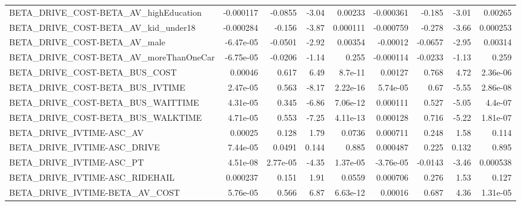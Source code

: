 \begin{tabular}{lrrrrrrrr}
BETA\_DRIVE\_COST-BETA\_AV\_highEducation              &   -0.000117 &      -0.0855 &    -3.04 &  0.00233 &  -0.000361 &      -0.185 &        -3.01 &       0.00265 \\
BETA\_DRIVE\_COST-BETA\_AV\_kid\_under18                &   -0.000284 &       -0.156 &    -3.87 & 0.000111 &  -0.000759 &      -0.278 &        -3.66 &      0.000253 \\
BETA\_DRIVE\_COST-BETA\_AV\_male                       &   -6.47e-05 &      -0.0501 &    -2.92 &  0.00354 &   -0.00012 &     -0.0657 &        -2.95 &       0.00314 \\
BETA\_DRIVE\_COST-BETA\_AV\_moreThanOneCar             &   -6.75e-05 &      -0.0206 &    -1.14 &    0.255 &  -0.000114 &     -0.0233 &        -1.13 &         0.259 \\
BETA\_DRIVE\_COST-BETA\_BUS\_COST                      &     0.00046 &        0.617 &     6.49 &  8.7e-11 &    0.00127 &       0.768 &         4.72 &      2.36e-06 \\
BETA\_DRIVE\_COST-BETA\_BUS\_IVTIME                    &    2.47e-05 &        0.563 &    -8.17 & 2.22e-16 &   5.74e-05 &        0.67 &        -5.55 &      2.86e-08 \\
BETA\_DRIVE\_COST-BETA\_BUS\_WAITTIME                  &    4.31e-05 &        0.345 &    -6.86 & 7.06e-12 &   0.000111 &       0.527 &        -5.05 &       4.4e-07 \\
BETA\_DRIVE\_COST-BETA\_BUS\_WALKTIME                  &    4.71e-05 &        0.553 &    -7.25 & 4.11e-13 &   0.000128 &       0.716 &        -5.22 &      1.81e-07 \\
BETA\_DRIVE\_IVTIME-ASC\_AV                           &     0.00025 &        0.128 &     1.79 &   0.0736 &   0.000711 &       0.248 &         1.58 &         0.114 \\
BETA\_DRIVE\_IVTIME-ASC\_DRIVE                        &    7.44e-05 &       0.0491 &    0.144 &    0.885 &   0.000487 &       0.225 &        0.132 &         0.895 \\
BETA\_DRIVE\_IVTIME-ASC\_PT                           &    4.51e-08 &     2.77e-05 &    -4.35 & 1.37e-05 &  -3.76e-05 &     -0.0143 &        -3.46 &      0.000538 \\
BETA\_DRIVE\_IVTIME-ASC\_RIDEHAIL                     &    0.000237 &        0.151 &     1.91 &   0.0559 &   0.000706 &       0.276 &         1.53 &         0.127 \\
BETA\_DRIVE\_IVTIME-BETA\_AV\_COST                     &    5.76e-05 &        0.566 &     6.87 & 6.63e-12 &    0.00016 &       0.687 &         4.36 &      1.31e-05 \\

\end{tabular}
